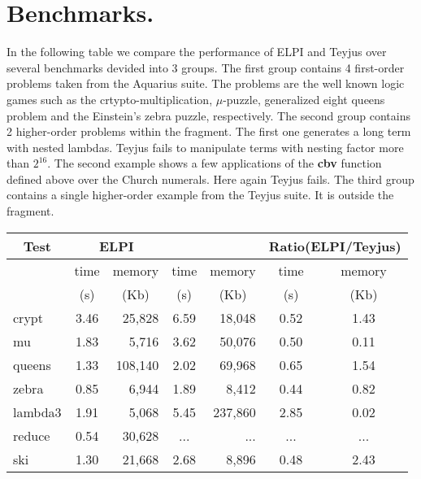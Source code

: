 \documentclass{llncs}
\begin{document}
\section{Benchmarks.}\label{sec:benchmarks}



In the following table we compare the performance of ELPI and Teyjus over several benchmarks 
devided into 3 groups. 
The first group contains 4 first-order problems taken from the Aquarius suite. The problems 
are the well known logic games such as the crtypto-multiplication, $\mu$-puzzle, 
generalized eight queens problem and the Einstein's zebra puzzle, respectively. The second group contains 
2 higher-order problems within the fragment. The first one generates a long term with nested 
lambdas. Teyjus fails to manipulate terms with nesting factor more than $2^{16}$. The second 
example shows a few applications of the {\bf cbv} function defined above over the 
Church numerals. Here again Teyjus fails. The third group contains a single higher-order 
example from the Teyjus suite. It is outside the fragment. 

\begin{center}

  \begin{tabular}{|p{1.5cm}||c|r||c|r||c|c|}
    \hline
      \multicolumn{1}{|c||}{Test} &
      \multicolumn{2}{|c||}{ELPI} &
      \multicolumn{2}{|c||}{\tedius{}} &
      \multicolumn{2}{|c|}{Ratio(ELPI/Teyjus)} \\
    \hline
      &  time     & memory  & time & memory &  time & memory \\
    
      &  \multicolumn{1}{c|}{(s)}  & \multicolumn{1}{c||}{(Kb)} & \multicolumn{1}{c|}{(s)}  & \multicolumn{1}{c||}{(Kb)} & \multicolumn{1}{c|}{(s)}  & \multicolumn{1}{c|}{(Kb)} \\
    \hline
    \hline
    crypt &  3.46 & 25,828  & 6.59 & 18,048 &  0.52 & 1.43 \\
    \hline    
    mu &  1.83 & 5,716 &  3.62 & 50,076 &  0.50 & 0.11 \\
    \hline
    queens &  1.33  & 108,140 &  2.02 & 69,968 &  0.65 & 1.54 \\
    \hline    
    zebra &  0.85 & 6,944 &  1.89 & 8,412 &  0.44 & 0.82 \\
    \hline     
    \hline
    lambda3 &  1.91 & 5,068 &  5.45 & 237,860 &  2.85 & 0.02 \\
    \hline
    reduce &  0.54 & 30,628 &   ... & ...   & ... & ... \\
    \hline
    \hline
    ski &  1.30 & 21,668 &  2.68 & 8,896  & 0.48 & 2.43 \\
    \hline
    
  \end{tabular}

 \end{center}



 
 


\end{document}
